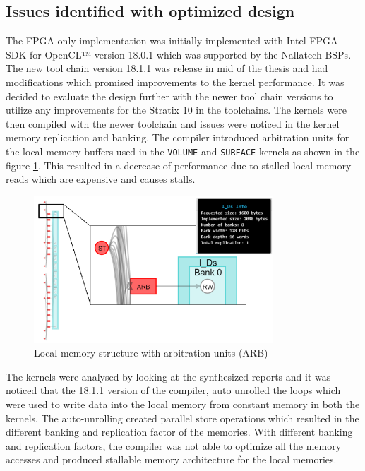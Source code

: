 \subsection{Issues identified with optimized design}

The FPGA only implementation was initially implemented with Intel FPGA
SDK for OpenCL™ version 18.0.1 which was supported by the Nallatech
BSPs. The new tool chain version 18.1.1 was release in mid of the thesis
and had modifications which promised improvements to the kernel performance.
It was decided to evaluate the design further with the newer tool chain versions to
utilize any improvements for the Stratix 10 in the toolchains.
The kernels were then compiled with the newer toolchain and issues
were noticed in the kernel memory replication and banking. The
compiler introduced arbitration units for the local memory
buffers used in the \texttt{VOLUME} and \texttt{SURFACE} kernels
as shown in the figure \ref{fig:arb}. This resulted in a decrease
of performance due to stalled local memory reads which are expensive
and causes stalls.

\begin{figure}[ht]%
    \centering
    \includegraphics[width=0.8\textwidth]{images/arb}
    \caption{Local memory structure with arbitration units (ARB)}
    \label{fig:arb}
\end{figure}

The kernels were analysed by looking at the synthesized reports and it was noticed that
the 18.1.1 version of the compiler, auto unrolled the loops which were used
to write data into the local memory from constant memory in both the kernels.
The auto-unrolling created parallel store operations which resulted in the
different banking and replication factor of the memories. With different
banking and replication factors, the compiler was not able to optimize
all the memory accesses and produced stallable memory architecture for the
local memories.

